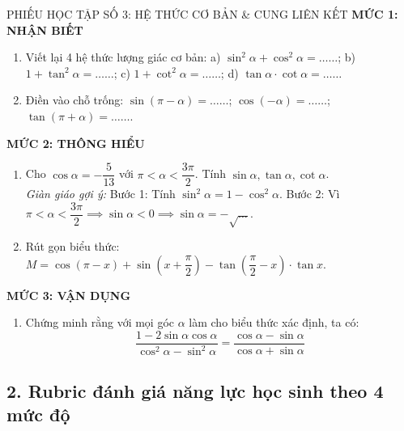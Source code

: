 \documentclass[12pt, a4paper]{article}
\begin{document}
\begin{pedabox}{PHIẾU HỌC TẬP SỐ 3: HỆ THỨC CƠ BẢN \& CUNG LIÊN KẾT}
\textbf{MỨC 1: NHẬN BIẾT}
\begin{enumerate}[leftmargin=0.5cm]
    \item Viết lại 4 hệ thức lượng giác cơ bản:
    a) $\sin^2\alpha + \cos^2\alpha = \dots\dots$; \quad b) $1 + \tan^2\alpha = \dots\dots$; \quad c) $1 + \cot^2\alpha = \dots\dots$; \quad d) $\tan\alpha \cdot \cot\alpha = \dots\dots$
    \item Điền vào chỗ trống: $\sin(\pi - \alpha) = \dots\dots$; \quad $\cos(-\alpha) = \dots\dots$; \quad $\tan(\pi + \alpha) = \dots\dots$.
\end{enumerate}

\textbf{MỨC 2: THÔNG HIỂU}
\begin{enumerate}[leftmargin=0.5cm]
    \item Cho $\cos\alpha = -\dfrac{5}{13}$ với $\pi < \alpha < \dfrac{3\pi}{2}$. Tính $\sin\alpha, \tan\alpha, \cot\alpha$.\\
    \textit{Giàn giáo gợi ý:} Bước 1: Tính $\sin^2\alpha = 1 - \cos^2\alpha$. Bước 2: Vì $\pi < \alpha < \dfrac{3\pi}{2} \implies \sin\alpha < 0 \implies \sin\alpha = -\sqrt{\dots}$.
    \item Rút gọn biểu thức: $M = \cos(\pi - x) + \sin\left(x + \dfrac{\pi}{2}\right) - \tan\left(\dfrac{\pi}{2} - x\right) \cdot \tan x$.
\end{enumerate}

\textbf{MỨC 3: VẬN DỤNG}
\begin{enumerate}[leftmargin=0.5cm]
    \item Chứng minh rằng với mọi góc $\alpha$ làm cho biểu thức xác định, ta có:
    $$\dfrac{1 - 2\sin\alpha\cos\alpha}{\cos^2\alpha - \sin^2\alpha} = \dfrac{\cos\alpha - \sin\alpha}{\cos\alpha + \sin\alpha}$$
\end{enumerate}
\end{pedabox}

\subsection*{2. Rubric đánh giá năng lực học sinh theo 4 mức độ}
\end{document}
